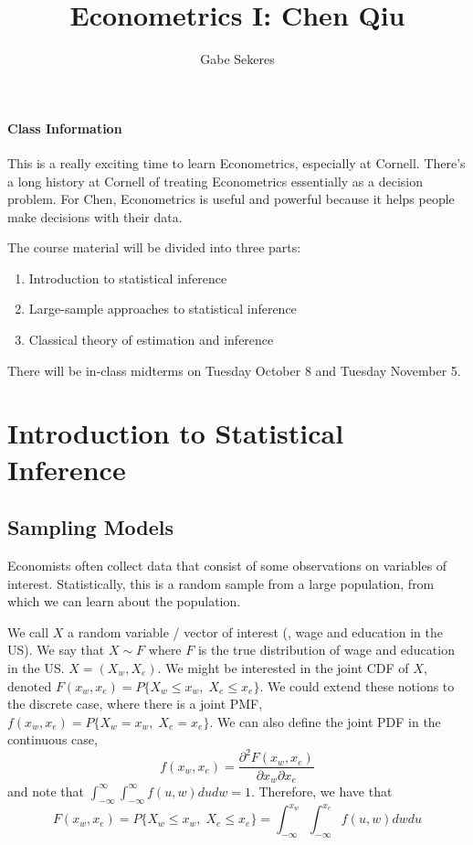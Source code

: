 \documentclass[10pt]{article}
\title{Econometrics I: Chen Qiu}
\author{Gabe Sekeres}
\begin{document}
\maketitle

\tableofcontents

\newpage

\paragraph{Class Information} This is a really exciting time to learn Econometrics, especially at Cornell. There's a long history at Cornell of treating Econometrics essentially as a decision problem. For Chen, Econometrics is useful and powerful because it helps people make decisions with their data.

The course material will be divided into three parts:
\begin{enumerate}
	\item Introduction to statistical inference
	\item Large-sample approaches to statistical inference
	\item Classical theory of estimation and inference
\end{enumerate}

There will be in-class midterms on Tuesday October 8 and Tuesday November 5.

\section{Introduction to Statistical Inference}

\subsection{Sampling Models}

Economists often collect data that consist of some observations on variables of interest. Statistically, this is a random sample from a large population, from which we can learn about the population.

We call $X$ a random variable / vector of interest (\eg, wage and education in the US). We say that $X \sim F$ where $F$ is the true distribution of wage and education in the US. $X = (X_w,X_e)$. We might be interested in the joint CDF of $X$, denoted $F(x_w,x_e) = P\{X_w \le x_w,\; X_e \le x_e\}$. We could extend these notions to the discrete case, where there is a joint PMF, $f(x_w,x_e) = P\{X_w = x_w,\;X_e = x_e\}$. We can also define the joint PDF in the continuous case, 
\[
f(x_w,x_e) = \frac{\partial^2 F(x_w,x_e)}{\partial x_w \partial x_e}
\]
and note that $\int_{-\infty}^\infty\int_{-\infty}^\infty f(u,w) dudw = 1$. Therefore, we have that
\[
F(x_w,x_e) = P\{X_w \le x_w,\; X_e \le x_e\} = \int_{-\infty}^{x_w} \int_{-\infty}^{x_e} f(u,w) dw du
\]
\end{document}
